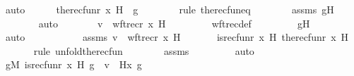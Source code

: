 \begin{isabellebody}
\ auto\isanewline
\ \ \ \ \isamarkupfalse%
\ {\isachardoublequoteopen}the{\isacharunderscore}{\kern0pt}recfun{\isacharparenleft}{\kern0pt}r{\isacharcomma}{\kern0pt}\ x{\isacharcomma}{\kern0pt}\ H{\isacharparenright}{\kern0pt}\ {\isacharequal}{\kern0pt}\ g{\isachardoublequoteclose}\ \isanewline
\ \ \ \ \ \ \isamarkupfalse%
{\isacharparenleft}{\kern0pt}rule\ the{\isacharunderscore}{\kern0pt}recfun{\isacharunderscore}{\kern0pt}eq{\isacharparenright}{\kern0pt}\isanewline
\ \ \ \ \ \ \isamarkupfalse%
\ assms\ gH\ \isanewline
\ \ \ \ \ \ \isamarkupfalse%
\ auto\isanewline
\ \ \ \ \isamarkupfalse%
\ \isamarkupfalse%
\ {\isachardoublequoteopen}v\ {\isacharequal}{\kern0pt}\ wftrec{\isacharparenleft}{\kern0pt}r{\isacharcomma}{\kern0pt}\ x{\isacharcomma}{\kern0pt}\ H{\isacharparenright}{\kern0pt}{\isachardoublequoteclose}\ \isanewline
\ \ \ \ \ \ \isamarkupfalse%
\ wftrec{\isacharunderscore}{\kern0pt}def\ \isanewline
\ \ \ \ \ \ \isamarkupfalse%
\ gH\ \isanewline
\ \ \ \ \ \ \isamarkupfalse%
\ auto\ \isanewline
\ \ \isamarkupfalse%
\ \isanewline
\ \ \ \ \isamarkupfalse%
\ assms{}{\isacharcolon}{\kern0pt}\ {\isachardoublequoteopen}v\ {\isacharequal}{\kern0pt}\ wftrec{\isacharparenleft}{\kern0pt}r{\isacharcomma}{\kern0pt}\ x{\isacharcomma}{\kern0pt}\ H{\isacharparenright}{\kern0pt}{\isachardoublequoteclose}\ \isanewline
\ \ \ \ \isamarkupfalse%
\ {\isachardoublequoteopen}is{\isacharunderscore}{\kern0pt}recfun{\isacharparenleft}{\kern0pt}r{\isacharcomma}{\kern0pt}\ x{\isacharcomma}{\kern0pt}\ H{\isacharcomma}{\kern0pt}\ the{\isacharunderscore}{\kern0pt}recfun{\isacharparenleft}{\kern0pt}r{\isacharcomma}{\kern0pt}\ x{\isacharcomma}{\kern0pt}\ H{\isacharparenright}{\kern0pt}{\isacharparenright}{\kern0pt}{\isachardoublequoteclose}\ \isanewline
\ \ \ \ \ \ \isamarkupfalse%
{\isacharparenleft}{\kern0pt}rule\ unfold{\isacharunderscore}{\kern0pt}the{\isacharunderscore}{\kern0pt}recfun{\isacharparenright}{\kern0pt}\isanewline
\ \ \ \ \ \ \isamarkupfalse%
\ assms\ \isanewline
\ \ \ \ \ \ \isamarkupfalse%
\ auto\isanewline
\ \ \ \ \isamarkupfalse%
\ \isamarkupfalse%
\ {\isachardoublequoteopen}{\isacharparenleft}{\kern0pt}{\isasymexists}g{\isacharbrackleft}{\kern0pt}{\isacharhash}{\kern0pt}{\isacharhash}{\kern0pt}M{\isacharbrackright}{\kern0pt}{\isachardot}{\kern0pt}\ is{\isacharunderscore}{\kern0pt}recfun{\isacharparenleft}{\kern0pt}r{\isacharcomma}{\kern0pt}\ x{\isacharcomma}{\kern0pt}\ H{\isacharcomma}{\kern0pt}\ g{\isacharparenright}{\kern0pt}\ {\isasymand}\ v\ {\isacharequal}{\kern0pt}\ H{\isacharparenleft}{\kern0pt}x{\isacharcomma}{\kern0pt}\ g{\isacharparenright}{\kern0pt}{\isacharparenright}{\kern0pt}{\isachardoublequoteclose}\ \isanewline

\end{isabellebody}
